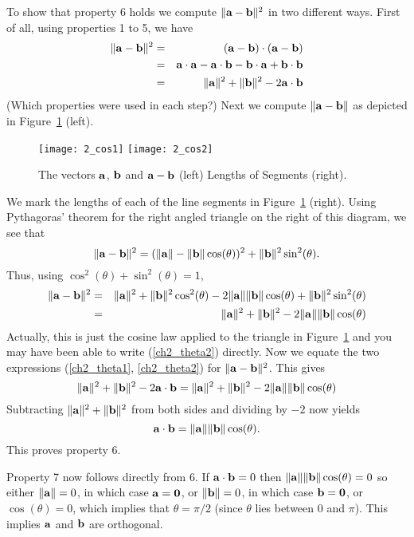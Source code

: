 To show that property 6 holds we compute $\|\aa-\bb\|^2$ in two
different ways.  First of all, using properties 1 to 5, we have
\begin{eqnarray}
\nonumber
\|\aa-\bb\|^2 & = & (\aa-\bb)\cdot(\aa-\bb) \\
 \nonumber
 & = & \aa\cdot\aa - \aa\cdot\bb - \bb\cdot\aa + \bb\cdot\bb \\
\label{ch2_theta1}
 & = & \|\aa\|^2 + \|\bb\|^2 - 2 \aa\cdot\bb
\end{eqnarray}
(Which properties were used in each step?) Next we compute
$\|\aa-\bb\|$ as depicted in Figure~\ref{fig_cos2} (left). 

\begin{figure}
\centerline{\texttt{[image: 2\_cos1]}
\texttt{[image: 2\_cos2]}}
\caption{The vectors $\aa$, $\bb$ and $\aa-\bb$ (left) 
Lengths of Segments (right). \label{fig_cos2}}
\end{figure}

We mark the lengths of each of the line segments in Figure~\ref{fig_cos2}
(right). 
Using Pythagoras' theorem for the right angled triangle on the right
of this diagram, we see that
\[
\|\aa-\bb\|^2 = (\|\aa\|-\|\bb\|\cos(\theta))^2 + \|\bb\|^2\sin^2(\theta).
\]
Thus, using $\cos^2(\theta)+\sin^2(\theta)=1$,
\begin{eqnarray}
\nonumber
\|\aa-\bb\|^2 & = & \|\aa\|^2+\|\bb\|^2\cos^2(\theta) -
2\|\aa\|\|\bb\|\cos(\theta) + \|\bb\|^2\sin^2(\theta) \\
\label{ch2_theta2}
 & = & \|\aa\|^2+\|\bb\|^2 - 2\|\aa\|\|\bb\|\cos(\theta)
\end{eqnarray}
Actually, this is just the cosine law applied to the triangle in Figure~\ref{fig_cos2}
and you may have been able to write (\ref{ch2_theta2}) directly. 
Now we equate the two expressions (\ref{ch2_theta1}, \ref{ch2_theta2}) 
for $\|\aa-\bb\|^2$. This gives
\[
\|\aa\|^2 + \|\bb\|^2 - 2 \aa\cdot\bb = \|\aa\|^2+\|\bb\|^2 -
2\|\aa\|\|\bb\|\cos(\theta)
\]
Subtracting $\|\aa\|^2 + \|\bb\|^2$ from both sides and dividing by
$-2$ now yields
\[
\aa\cdot\bb=\|\aa\|\|\bb\|\cos(\theta).
\]
This proves property 6.

Property 7 now follows directly from 6. If $\aa\cdot\bb = 0$ then
$\|\aa\|\|\bb\|\cos(\theta)=0$ so either $\|\aa\|=0$, in which case
$\aa=\zv$, or $\|\bb\|=0$, in which case $\bb=\zv$, or
$\cos(\theta)=0$, which implies that $\theta = \pi/2$ (since $\theta$
lies between $0$ and $\pi$).  This implies $\aa$ and $\bb$ are
orthogonal.

